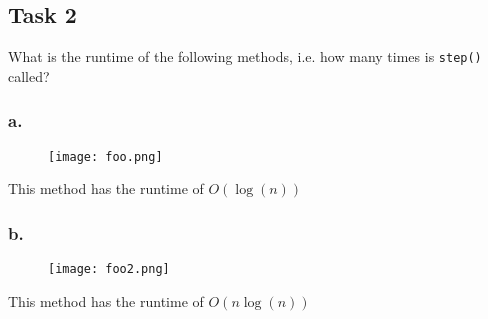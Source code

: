 \documentclass{article}
\begin{document}
\subsection{Task 2}
What is the runtime of the following methods, i.e. how many times is \texttt{step()} called?

\subsubsection{a.}
\begin{figure}[H]
    \begin{center}
        \texttt{[image: foo.png]}
    \end{center}
\end{figure}

This method has the runtime of \( O\left( \log (n) \right) \) 
\subsubsection{b.}
\begin{figure}[H]
    \begin{center}
        \texttt{[image: foo2.png]}
    \end{center}
\end{figure}

This method has the runtime of \( O\left( n \log\left( n \right) \right) \)
\end{document}
